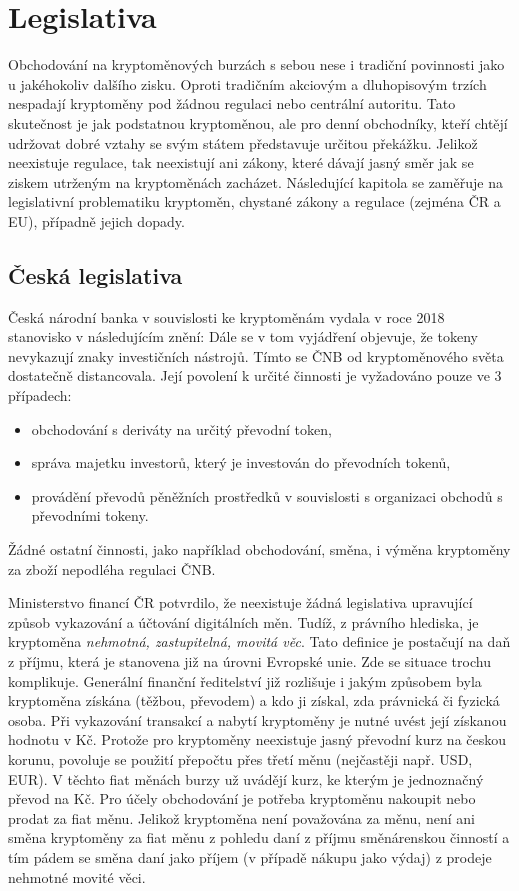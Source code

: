 \chapter{Legislativa}
\label{sec:Legislation}
Obchodování na kryptoměnových burzách s sebou nese i tradiční povinnosti jako u jakéhokoliv dalšího zisku. Oproti tradičním akciovým a dluhopisovým trzích nespadají kryptoměny pod žádnou
regulaci nebo centrální autoritu. Tato skutečnost je jak podstatnou kryptoměnou, ale pro denní obchodníky, kteří chtějí udržovat dobré vztahy se svým státem představuje určitou překážku.
Jelikož neexistuje regulace, tak neexistují ani zákony, které dávají jasný směr jak se ziskem utrženým na kryptoměnách zacházet. Následující kapitola se zaměřuje na legislativní problematiku
kryptoměn, chystané zákony a regulace (zejména ČR a EU), případně jejich dopady.


\section*{Česká legislativa}
Česká národní banka v souvislosti ke kryptoměnám vydala v roce 2018 stanovisko v následujícím znění:  \cite{crypto:cz-national-bank}
Dále se v tom vyjádření objevuje, že tokeny nevykazují znaky investičních nástrojů. Tímto se ČNB od kryptoměnového světa dostatečně distancovala. Její povolení k určité činnosti
je vyžadováno pouze ve 3 případech:
\begin{itemize}
    \item obchodování s deriváty na určitý převodní token,
    \item správa majetku investorů, který je investován do převodních tokenů,
    \item provádění převodů pěněžních prostředků v souvislosti s organizaci obchodů s převodními tokeny.
\end{itemize}
Žádné ostatní činnosti, jako například obchodování, směna, i výměna kryptoměny za zboží nepodléha regulaci ČNB.

Ministerstvo financí ČR potvrdilo, že neexistuje žádná legislativa upravující způsob vykazování a účtování digitálních měn. \cite{crypto:cz-ministry-of-finance}
Tudíž, z právního hlediska, je kryptoměna \emph{nehmotná, zastupitelná, movitá věc}. Tato definice je postačují na daň z příjmu, která je stanovena již na úrovni Evropské unie.
Zde se situace trochu komplikuje. Generální finanční ředitelství již rozlišuje i jakým způsobem byla kryptoměna získána (těžbou, převodem) a kdo ji získal, zda právnická či fyzická osoba.
Při vykazování transakcí a nabytí kryptoměny je nutné uvést její získanou hodnotu v Kč. Protože pro kryptoměny neexistuje jasný převodní kurz na českou korunu, povoluje se použití přepočtu přes
třetí měnu (nejčastěji např. USD, EUR). V těchto fiat měnách burzy už uvádějí kurz, ke kterým je jednoznačný převod na Kč.   
Pro účely obchodování je potřeba kryptoměnu nakoupit nebo prodat za fiat měnu. Jelikož kryptoměna není považována za měnu, není ani směna kryptoměny za fiat měnu z pohledu
daní z příjmu směnárenskou činností a tím pádem se směna daní jako příjem (v případě nákupu jako výdaj) z prodeje nehmotné movité věci.

